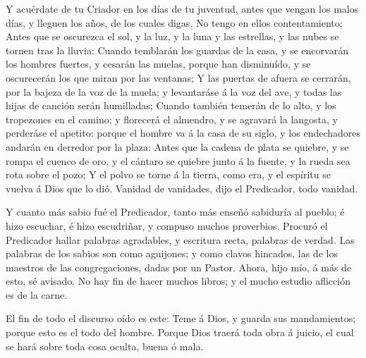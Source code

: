  Y acuérdate de tu Criador en los días de tu juventud, antes
que vengan los malos días, y lleguen los años, de los cuales digas, No
tengo en ellos contentamiento;  Antes que se oscurezca el
sol, y la luz, y la luna y las estrellas, y las nubes se tornen tras la
lluvia:  Cuando temblarán los guardas de la casa, y se
encorvarán los hombres fuertes, y cesarán las muelas, porque han
disminuído, y se oscurecerán los que miran por las ventanas;
 Y las puertas de afuera se cerrarán, por la bajeza de la
voz de la muela; y levantaráse á la voz del ave, y todas las hijas de
canción serán humilladas;  Cuando también temerán de lo
alto, y los tropezones en el camino; y florecerá el almendro, y se
agravará la langosta, y perderáse el apetito: porque el hombre va á la
casa de su siglo, y los endechadores andarán en derredor por la plaza:
 Antes que la cadena de plata se quiebre, y se rompa el
cuenco de oro, y el cántaro se quiebre junto á la fuente, y la rueda sea
rota sobre el pozo;  Y el polvo se torne á la tierra, como
era, y el espíritu se vuelva á Dios que lo dió.  Vanidad de
vanidades, dijo el Predicador, todo vanidad.

 Y cuanto más sabio fué el Predicador, tanto más enseñó
sabiduría al pueblo; é hizo escuchar, é hizo escudriñar, y compuso
muchos proverbios.  Procuró el Predicador hallar palabras
agradables, y escritura recta, palabras de verdad.  Las
palabras de los sabios son como aguijones; y como clavos hincados, las
de los maestros de las congregaciones, dadas por un Pastor.
 Ahora, hijo mío, á más de esto, sé avisado. No hay fin de
hacer muchos libros; y el mucho estudio aflicción es de la carne.

 El fin de todo el discurso oído es este: Teme á Dios, y
guarda sus mandamientos; porque esto es el todo del hombre.
 Porque Dios traerá toda obra á juicio, el cual se hará
sobre toda cosa oculta, buena ó mala.
